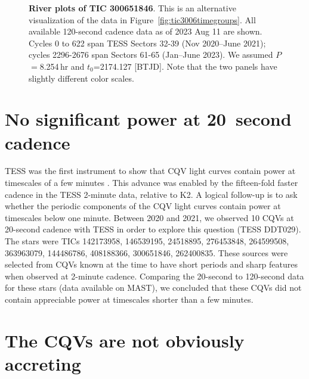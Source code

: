 \documentclass[11pt,twocolumn,tighten]{aastex63}
\begin{document}
\begin{figure*}[!t]
	\begin{center}
	\end{center}
	\vspace{-0.4cm}
	\caption{
		{\bf River plots of TIC 300651846}.
    This is an alternative visualization of the data in
    Figure~\ref{fig:tic3006timegroups}.  All available 120-second
    cadence data as of 2023 Aug 11 are shown.  Cycles 0 to 622 span
    TESS Sectors 32-39 (Nov 2020--June 2021); cycles 2296-2676 span
    Sectors 61-65 (Jan--June 2023).  We assumed $P$$=$8.254\,hr and
    $t_0$=2174.127 [BTJD].  Note that the two panels have slightly
    different color scales.
	}
	\label{fig:tic3006river}
\end{figure*}



\section{No significant power at 20~second cadence}

TESS was the first instrument to show that CQV light curves contain
power at timescales of a few minutes
\citep{2019A&A...625L..13Z,2022AJ....163..144G}.  This advance was
enabled by the fifteen-fold faster cadence in the TESS 2-minute data,
relative to K2.  A logical follow-up is to ask whether the periodic
components of the CQV light curves contain power at timescales below
one minute.  Between 2020 and 2021, we observed 10 CQVs at 20-second
cadence with TESS in order to explore this question (TESS DDT029).
The stars were TICs 142173958, 146539195, 24518895, 276453848,
264599508, 363963079, 144486786, 408188366, 300651846, 262400835.
These sources were selected from CQVs known at the time to have short
periods and sharp features when observed at 2-minute cadence.
Comparing the 20-second to 120-second data for these stars (data
available on MAST), we concluded that these CQVs did not contain
appreciable power at timescales shorter than a few minutes.


\section{The CQVs are not obviously accreting}
\end{document}
